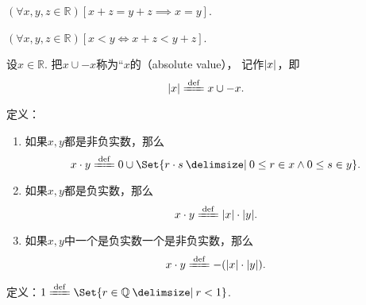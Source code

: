 \begin{corollary}\label{theorem:集合论.实数的消去律}
\((\forall x,y,z\in\mathbb{R})[
	x+z=y+z \implies x=y
]\).
\end{corollary}

\begin{theorem}\label{theorem:集合论.实数的加法的保序性}
\((\forall x,y,z\in\mathbb{R})[
	x<y \iff x+z<y+z
]\).
\end{theorem}

\begin{definition}
设\(x\in\mathbb{R}\).
把\(x \cup -x\)称为“\(x\)的（absolute value），
记作\(\abs{x}\)，即\[
	\abs{x} \defeq x \cup -x.
\]
\end{definition}

\begin{definition}
定义：
\begin{enumerate}
	\item 如果\(x,y\)都是非负实数，那么\[
		x \cdot y
		\defeq
		0 \cup \Set{ r \cdot s \given 0 \leq r \in x \land 0 \leq s \in y }.
	\]

	\item 如果\(x,y\)都是负实数，那么\[
		x \cdot y \defeq \abs{x} \cdot \abs{y}.
	\]

	\item 如果\(x,y\)中一个是负实数一个是非负实数，那么\[
		x \cdot y \defeq -(\abs{x} \cdot \abs{y}).
	\]
\end{enumerate}
\end{definition}

\begin{definition}
定义：\(1\defeq\Set{ r\in\mathbb{Q} \given r < 1 }\).
\end{definition}

